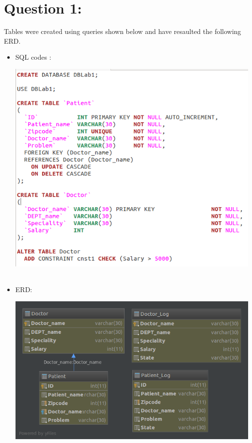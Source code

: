 \documentclass{article}
\begin{document}
\section{Question 1:}
Tables were created using queries shown below and have resaulted the following ERD.
\begin{itemize}
    \item
    SQL codes :
    
    	\includegraphics[scale=0.4]{figs/1.png}\
    \item
    ERD: 

		\includegraphics[scale=0.4]{figs/ERD.png}\
\end{itemize}
\end{document}
